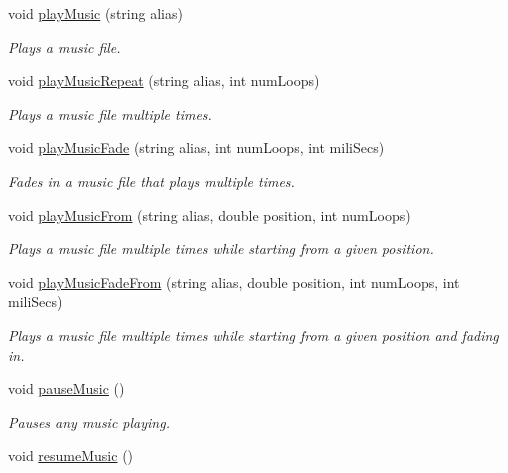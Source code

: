\begin{CompactItemize}
void \hyperlink{class_audio_bd144ca5357828282ba0a6b328d770b7}{playMusic} (string alias)
\begin{CompactList}\small\item\em Plays a music file. \item\end{CompactList}\item 
void \hyperlink{class_audio_a9ec7ff20da8b33428d39b0262743dac}{playMusicRepeat} (string alias, int numLoops)
\begin{CompactList}\small\item\em Plays a music file multiple times. \item\end{CompactList}\item 
void \hyperlink{class_audio_10bf7c77227aba561ddb6e5870cc092d}{playMusicFade} (string alias, int numLoops, int miliSecs)
\begin{CompactList}\small\item\em Fades in a music file that plays multiple times. \item\end{CompactList}\item 
void \hyperlink{class_audio_c2b309bce1a1ffe3560f34a8a6027597}{playMusicFrom} (string alias, double position, int numLoops)
\begin{CompactList}\small\item\em Plays a music file multiple times while starting from a given position. \item\end{CompactList}\item 
void \hyperlink{class_audio_0d60e2b77d91abc362f46dcf0a11325f}{playMusicFadeFrom} (string alias, double position, int numLoops, int miliSecs)
\begin{CompactList}\small\item\em Plays a music file multiple times while starting from a given position and fading in. \item\end{CompactList}\item 
void \hyperlink{class_audio_8903a4e19354aa20cee9bbe10eb98004}{pauseMusic} ()
\begin{CompactList}\small\item\em Pauses any music playing. \item\end{CompactList}\item 
void \hyperlink{class_audio_0be741f8374145f05250c8adaaa2b0d9}{resumeMusic} ()

\end{CompactItemize}
